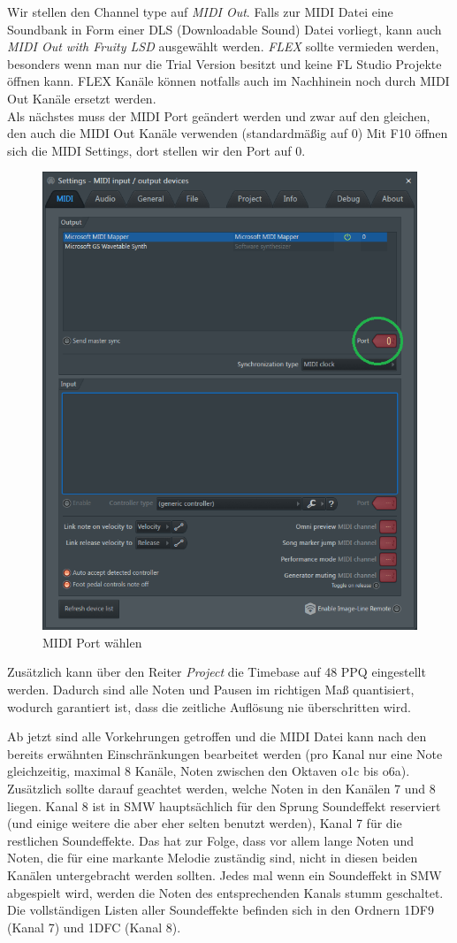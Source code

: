 Wir stellen den Channel type auf \textit{MIDI Out}. Falls zur MIDI Datei eine Soundbank in Form einer DLS (Downloadable Sound) Datei vorliegt, kann auch \textit{MIDI Out with Fruity LSD} ausgewählt werden. \textit{FLEX} sollte vermieden werden, besonders wenn man nur die Trial Version besitzt und keine FL Studio Projekte öffnen kann. FLEX Kanäle können notfalls auch im Nachhinein noch durch MIDI Out Kanäle ersetzt werden. \\
Als nächstes muss der MIDI Port geändert werden und zwar auf den gleichen, den auch die MIDI Out Kanäle verwenden (standardmäßig auf 0) Mit F10 öffnen sich die MIDI Settings, dort stellen wir den Port auf 0.

\bigskip

\begin{figure}[htbp] \centering
	\includegraphics[width=.63\linewidth]{images/MIDIPort.png}
	\caption{MIDI Port wählen}
	\label{MIDIPort}
\end{figure}

Zusätzlich kann über den Reiter \textit{Project} die Timebase auf 48 PPQ eingestellt werden. Dadurch sind alle Noten und Pausen im richtigen Maß quantisiert, wodurch garantiert ist, dass die zeitliche Auflösung nie überschritten wird.

\bigskip

Ab jetzt sind alle Vorkehrungen getroffen und die MIDI Datei kann nach den bereits erwähnten Einschränkungen bearbeitet werden (pro Kanal nur eine Note gleichzeitig, maximal 8 Kanäle, Noten zwischen den Oktaven o1c bis o6a).
Zusätzlich sollte darauf geachtet werden, welche Noten in den Kanälen 7 und 8 liegen. Kanal 8 ist in SMW hauptsächlich für den Sprung Soundeffekt reserviert (und einige weitere die aber eher selten benutzt werden), Kanal 7 für die restlichen Soundeffekte. Das hat zur Folge, dass vor allem lange Noten und Noten, die für eine markante Melodie zuständig sind, nicht in diesen beiden Kanälen untergebracht werden sollten. Jedes mal wenn ein Soundeffekt in SMW abgespielt wird, werden die Noten des entsprechenden Kanals stumm geschaltet. \\
Die vollständigen Listen aller Soundeffekte befinden sich in den Ordnern 1DF9 (Kanal 7) und 1DFC (Kanal 8).

